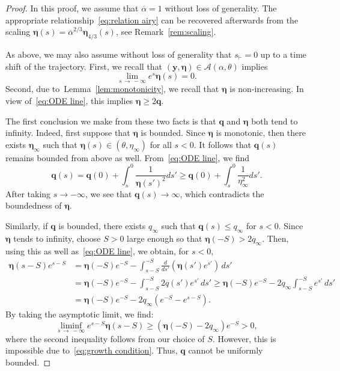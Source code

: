 \documentclass[10pt]{amsart}
\theoremstyle{definition}\newtheorem{defi}[theo]{Definition}\newtheorem{rema}[theo]{Remark}\newtheorem{exam}[theo]{Example}\newtheorem{exem}[theo]{Example}\newtheorem{nota}[theo]{Notation}
\newcommand{\bq}{\mathbf{q}}
\newcommand{\by}{\mathbf{y}}
\newcommand{\bA}{\mathscr{A}}
\newcommand{\beeta}{\boldsymbol{\eta}}
\newcommand{\1}{\mathds{1}}
\newcommand{\shh}{s_{\vdash}}
\begin{document}
\begin{proof}
In this proof, we assume that $\overline{\alpha} =1$ without loss of generality. The appropriate relationship~\eqref{eq:relation airy} can be recovered afterwards from the scaling $\beeta(s) = \overline{\alpha}^{2/3} \beeta_{4/3}(s)$, see Remark~\ref{rem:scaling}.

As above, we may also assume without loss of generality that $\shh = 0$ up to a time shift of the trajectory. First, we recall that $(\by,\beeta) \in \bA(\alpha,\theta)$ implies
\begin{equation}\label{eq:growth condition}
\lim_{s\,\to\,-\infty} e^s \beeta(s) = 0.
\end{equation}
Second, due to~Lemma~\ref{lem:monotonicity}, we recall that $\beeta$ is non-increasing. In view of~\eqref{eq:ODE line}, this implies $\beeta \geq 2\bq$.

The first conclusion we make from these two facts is that $\bq$ and $\beeta$ both tend to infinity. Indeed, first suppose that $\beeta$ is bounded. Since $\beeta$ is monotonic, then there exists $\beeta_\infty$ such that $\beeta(s) \in (\theta, \eta_\infty)$ for all $s<0$. It follows that $\bq(s)$ remains bounded from above as well. From~\eqref{eq:ODE line}, we find
\[
\bq(s) = \bq(0) + \int_s^0 \frac{1}{\beeta(s')^2}ds'
\geq \bq(0) + \int_s^0 \frac{1}{\eta_\infty^2} ds'.
\]
After taking $s\to-\infty$, we see that $\bq(s) \to \infty$, which contradicts the boundedness of $\beeta$.

Similarly, if $\bq$ is bounded, there exists $q_\infty$ such that $\bq(s) \leq q_\infty$ for $s<0$. Since $\beeta$ tends to infinity, choose $S>0$ large enough so that $\beeta(-S) > 2q_\infty$. Then, using this as well as~\eqref{eq:ODE line}, we obtain, for $s<0$,
\begin{align*}
\beeta(s-S)e^{s-S}
&= \beeta(-S)e^{-S}-\int_{s-S}^{-S} \frac d{ds'}\left (\beeta(s')e^{s'}\right)\, ds'\\
&= \beeta(-S)e^{-S}-\int_{s-S}^{-S} 2q(s') e^{s'} \, ds'
\geq \beeta(-S)e^{-S} -2q_\infty \int_{s-S}^{-S} e^{s'} \, ds'\\
&= \beeta(-S)e^{-S} -2q_\infty\left(e^{-S}-e^{s-S}\right).
\end{align*}
By taking the asymptotic limit, we find:
\[
\liminf_{s\,\rightarrow\,-\infty} e^{s-S} \beeta(s-S) \geq \left(\beeta(-S) -2q_\infty\right)e^{-S} >0,
\]
where the second inequality follows from our choice of $S$. However, this is impossible due to~\eqref{eq:growth condition}. Thus, $\bq$ cannot be uniformly bounded.


\end{proof}
\end{document}
